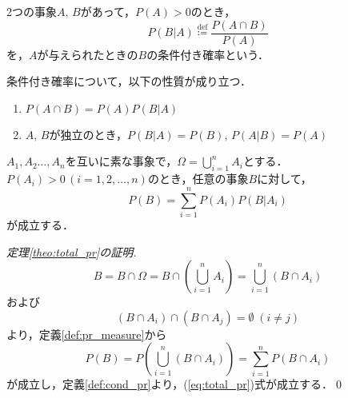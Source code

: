 \documentclass{jsreport}
\begin{document}
\begin{screen}
  \begin{defi}[条件付き確率]\label{def:cond_pr}
    2つの事象$A, \, B$があって，$P(A) > 0$のとき，
    \begin{equation}
      P(B|A) \stackrel{\mathrm{def}}{\coloneqq} \frac{P(A \cap B)}{P(A)} \nonumber
    \end{equation}
    を，$A$が与えられたときの$B$の条件付き確率という．
  \end{defi}
\end{screen}
条件付き確率について，以下の性質が成り立つ．
\begin{enumerate}
  \item $P(A \cap B) = P(A) P(B|A)$
  \item $A, \, B$が独立のとき，$P(B|A) = P(B), \, P(A|B) = P(A)$
\end{enumerate}

\begin{screen}
  \begin{theo}[全確率の法則]\label{theo:total_pr}
    $A_1, A_2 \ldots, A_n$を互いに素な事象で，$\Omega = \bigcup_{i = 1}^n A_i$とする．
    $P(A_i) > 0 \, (i = 1, 2, \ldots, n)$のとき，任意の事象$B$に対して，
    \begin{equation}\label{eq:total_pr}
      P(B) = \sum_{i = 1}^n P(A_i) P(B | A_i)
    \end{equation}
    が成立する．
  \end{theo}
\end{screen}

\begin{proof}[定理\ref{theo:total_pr}の証明]
  \begin{equation}
    B = B \cap \Omega = B \cap \left(\bigcup_{i = 1}^n A_i\right) = \bigcup_{i = 1}^n (B \cap A_i) \nonumber
  \end{equation}
  および
  \begin{equation}
    (B \cap A_i) \cap (B \cap A_j) = \emptyset \; (i \neq j) \nonumber
  \end{equation}
  より，定義\ref{def:pr_measure}から
  \begin{equation}
    P(B) = P\left(\bigcup_{i = 1}^n (B \cap A_i)\right) = \sum_{i = 1}^n P(B \cap A_i) \nonumber
  \end{equation}
  が成立し，定義\ref{def:cond_pr}より，(\ref{eq:total_pr})式が成立する．\qed
\end{proof}
\end{document}
